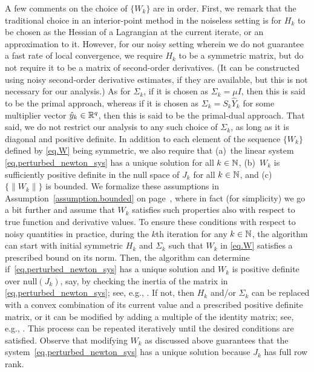 A few comments on the choice of $\{W_k\}$ are in order.  First, we remark that the traditional choice in an interior-point method in the noiseless setting is for $H_k$ to be chosen as the Hessian of a Lagrangian at the current iterate, or an approximation to it.  However, for our noisy setting wherein we do not guarantee a fast rate of local convergence, we require $H_k$ to be a symmetric matrix, but do not require it to be a matrix of second-order derivatives.  (It can be constructed using noisy second-order derivative estimates, if they are available, but this is not necessary for our analysis.)  As for $\Sigma_k$, if it is chosen as $\Sigma_k = \mu I$, then this is said to be the primal approach, whereas if it is chosen as $\Sigma_k = S_k\hat Y_k$ for some multiplier vector $\hat y_k \in \mathbb{R}^q$, then this is said to be the primal-dual approach.  That said, we do not restrict our analysis to any such choice of $\Sigma_k$, as long as it is diagonal and positive definite.  In addition to each element of the sequence $\{W_k\}$ defined by \eqref{eq.W} being symmetric, we also require that (a)~the linear system \eqref{eq.perturbed_newton_sys} has a unique solution for all $k \in \mathbb{N}$, (b)~$W_k$ is sufficiently positive definite in the null space of $J_k$ for all $k \in \mathbb{N}$, and (c)~$\{\|W_k\|\}$ is bounded.  We formalize these assumptions in Assumption~\ref{assumption.bounded} on page~\pageref{assumption.bounded}, where in fact (for simplicity) we go a bit further and assume that $W_k$ satisfies such properties also with respect to true function and derivative values.  To ensure these conditions with respect to noisy quantities in practice, during the $k$th iteration for any $k \in \mathbb{N}$, the algorithm can start with initial symmetric $H_k$ and $\Sigma_k$ such that $W_k$ in \eqref{eq.W} satisfies a prescribed bound on its norm.  Then, the algorithm can determine if~\eqref{eq.perturbed_newton_sys} has a unique solution and $W_k$ is positive definite over $\mathrm{null}(J_k)$, say, by checking the inertia of the matrix in \eqref{eq.perturbed_newton_sys}; see, e.g., \cite{nocedal1999numerical}.  If not, then $H_k$ and/or $\Sigma_k$ can be replaced with a convex combination of its current value and a prescribed positive definite matrix, or it can be modified by adding a multiple of the identity matrix; see, e.g., \cite{wachter2006implementation}.  This process can be repeated iteratively until the desired conditions are satisfied.  Observe that modifying $W_k$ as discussed above guarantees that the system~\eqref{eq.perturbed_newton_sys} has a unique solution because $J_k$ has full row rank. 


